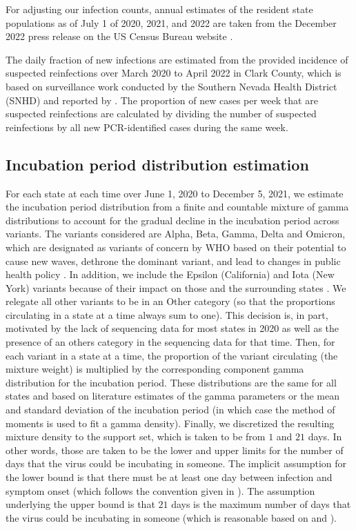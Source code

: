 \documentclass{article}
\begin{document}
For adjusting our infection counts, annual estimates of the resident state populations as of July 1 of 2020, 2021, and 2022 are taken from the December 2022 press release on the US Census Bureau website \citep{uscensus2022annual}.

The daily fraction of new infections are estimated from the provided incidence of suspected reinfections over March 2020 to April 2022 in Clark County, which is based on surveillance work conducted by the Southern Nevada Health District (SNHD) and reported by \citet{ruff2022rapid}. The proportion of new cases per week that are suspected reinfections are calculated by dividing the number of suspected reinfections by all new PCR-identified cases during the same week.  %

\subsection{Incubation period distribution estimation} For each state at each time over June 1, 2020 to December 5, 2021, we estimate the incubation period distribution from a finite and countable mixture of gamma distributions to account for the gradual decline in the incubation period across variants. The variants considered are Alpha, Beta, Gamma, Delta and Omicron, which are designated as variants of concern by WHO based on their potential to cause new waves, dethrone the dominant variant, and lead to changes in public health policy \citep{who2021tracking}. In addition, we include the Epsilon (California) and Iota (New York) variants because of their impact on those and the surrounding states \citep{yang2022investigation, duerr2021dominance}. We relegate all other variants to be in an Other category (so that the proportions circulating in a state at a time always sum to one). This decision is, in part, motivated by the lack of sequencing data for most states in 2020 as well as the presence of an others category in the sequencing data for that time. %
Then, for each variant in a state at a time, the proportion of the variant circulating (the mixture weight) is multiplied by the corresponding component gamma distribution for the incubation period. These distributions are the same for all states and based on literature estimates of the gamma parameters or the mean and standard deviation of the incubation period (in which case the method of moments is used to fit a gamma density). Finally, we discretized the resulting mixture density to the support set, which is taken to be from $1$ and $21$ days. In other words, those are taken to be the lower and upper limits for the number of days that the virus could be incubating in someone. The implicit assumption for the lower bound is that there must be at least one day between infection and symptom onset (which follows the convention given in \citet{phcan2021covid}). The assumption underlying the upper bound is that $21$ days is the maximum number of days that the virus could be incubating in someone (which is reasonable based on \citet{zaki2021estimations} and \citet{cortes2022sars}).
\end{document}
